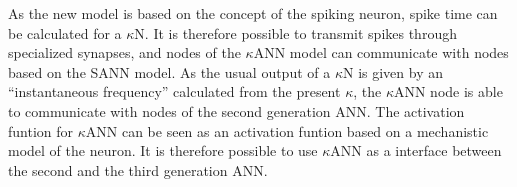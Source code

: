 As the new model is based on the concept of the spiking neuron, spike time can be calculated for a $\kappa$N.
It is therefore possible to transmit spikes through specialized synapses, and nodes of the $\kappa$ANN model can communicate with nodes based on the SANN model.
As the usual output of a $\kappa$N is given by an ``instantaneous frequency'' calculated from the present $\kappa$, the $\kappa$ANN node is able to communicate with nodes of the second generation ANN.
The activation funtion for $\kappa$ANN can be seen as an activation funtion based on a mechanistic model of the neuron.
It is therefore possible to use $\kappa$ANN as a interface between the second and the third generation ANN.


%
%










